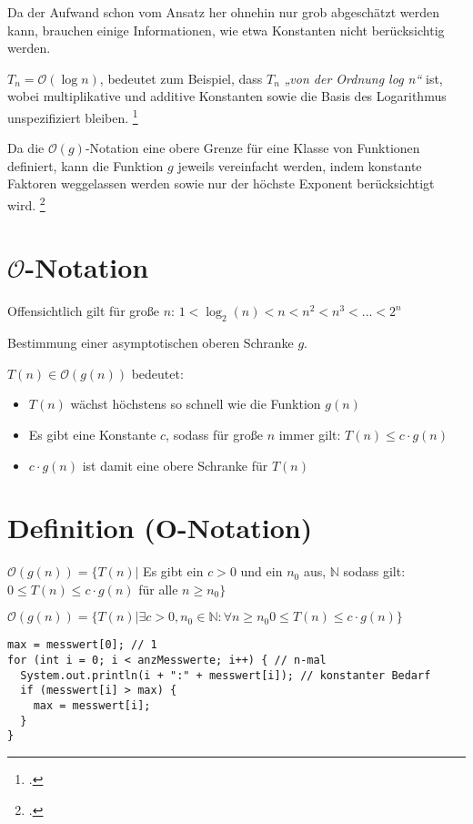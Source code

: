 \documentclass{bschlangaul-theorie}
\begin{document}
Da der Aufwand schon vom Ansatz her ohnehin nur grob abgeschätzt werden
kann, brauchen einige Informationen, wie etwa Konstanten nicht
berücksichtig werden.

 $T_n = \mathcal{O}(\log n)$, bedeutet zum Beispiel, dass $T_n$
\emph{„von der Ordnung log n“} ist, wobei multiplikative und additive
Konstanten sowie die Basis des Logarithmus unspezifiziert bleiben.
\footcite[Seite 200 (PDF 2018)]{saake}

Da die $\mathcal{O}(g)$-Notation eine obere Grenze für eine Klasse von
Funktionen definiert, kann die Funktion $g$ jeweils vereinfacht werden,
indem konstante Faktoren weggelassen werden sowie nur der höchste
Exponent berücksichtigt wird.
\footcite[Seite 201 (PDF 2019)]{saake}

\section{$\mathcal{O}$-Notation}

Offensichtlich gilt für große $n$:
$1 < \log_2(n) < n < n^2 < n^3 < ... < 2^n$

Bestimmung einer asymptotischen oberen Schranke $g$.

$T(n) \in \mathcal{O}(g(n))$ bedeutet:

\begin{itemize}
\item $T(n)$ wächst höchstens so schnell wie die Funktion $g(n)$

\item Es gibt eine Konstante $c$, sodass für große $n$ immer gilt: $T(n)
\leq c \cdot g(n)$

\item $c \cdot g(n)$ ist damit eine obere Schranke für $T(n)$
\end{itemize}

\section{Definition (O-Notation)}

$\mathcal{O}(g(n)) = \{T(n)|$
Es gibt ein
$c > 0$
und ein
$n_0$
aus,
$\mathbb{N}$
sodass gilt:
$0 \leq T(n) \leq c \cdot g(n)$
für alle
$n \geq n_0\}$

$\mathcal{O}(g(n)) = \{T(n)|
\exists
c > 0,
n_0 \in \mathbb{N}:
\forall n \geq n_0 0 \leq T(n) \leq c \cdot g(n)
\}$

\begin{verbatim}
max = messwert[0]; // 1
for (int i = 0; i < anzMesswerte; i++) { // n-mal
  System.out.println(i + ":" + messwert[i]); // konstanter Bedarf
  if (messwert[i] > max) {
    max = messwert[i];
  }
}
\end{verbatim}
\end{document}
